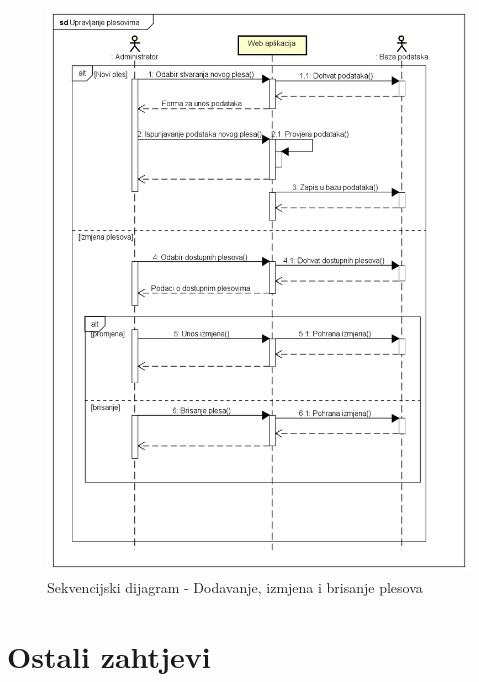 		\begin{figure}[H]
			\includegraphics[scale=0.4]{slike/SD-Upravljanje plesovima.PNG} %
			\centering
			\caption{Sekvencijski dijagram - Dodavanje, izmjena i brisanje plesova}
			\label{fig:administr}
		\end{figure}
		

				\eject
	
		\section{Ostali zahtjevi}
	
